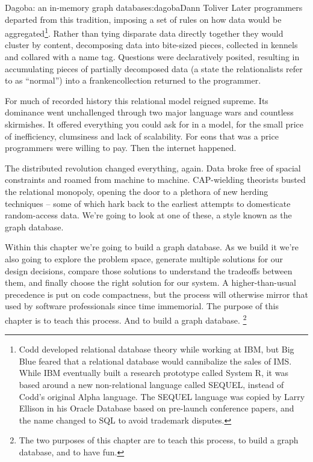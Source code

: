 \begin{aosachapter}{Dagoba: an in-memory graph database}{s:dagoba}{Dann Toliver}
Later programmers departed from this tradition, imposing a set of rules
on how data would be aggregated\footnote{Codd developed relational
  database theory while working at IBM, but Big Blue feared that a
  relational database would cannibalize the sales of IMS. While IBM
  eventually built a research prototype called System R, it was based
  around a new non-relational language called SEQUEL, instead of Codd's
  original Alpha language. The SEQUEL language was copied by Larry
  Ellison in his Oracle Database based on pre-launch conference papers,
  and the name changed to SQL to avoid trademark disputes.}. Rather than
tying disparate data directly together they would cluster by content,
decomposing data into bite-sized pieces, collected in kennels and
collared with a name tag. Questions were declaratively posited,
resulting in accumulating pieces of partially decomposed data (a state
the relationalists refer to as ``normal'') into a frankencollection
returned to the programmer.

For much of recorded history this relational model reigned supreme. Its
dominance went unchallenged through two major language wars and
countless skirmishes. It offered everything you could ask for in a
model, for the small price of inefficiency, clumsiness and lack of
scalability. For eons that was a price programmers were willing to pay.
Then the internet happened.

The distributed revolution changed everything, again. Data broke free of
spacial constraints and roamed from machine to machine. CAP-wielding
theorists busted the relational monopoly, opening the door to a plethora
of new herding techniques -- some of which hark back to the earliest
attempts to domesticate random-access data. We're going to look at one
of these, a style known as the graph database.

\label{take-one}

Within this chapter we're going to build a graph database. As we build
it we're also going to explore the problem space, generate multiple
solutions for our design decisions, compare those solutions to
understand the tradeoffs between them, and finally choose the right
solution for our system. A higher-than-usual precedence is put on code
compactness, but the process will otherwise mirror that used by software
professionals since time immemorial. The purpose of this chapter is to
teach this process. And to build a graph database. \footnote{The two
  purposes of this chapter are to teach this process, to build a graph
  database, and to have fun.}


\end{aosachapter}
